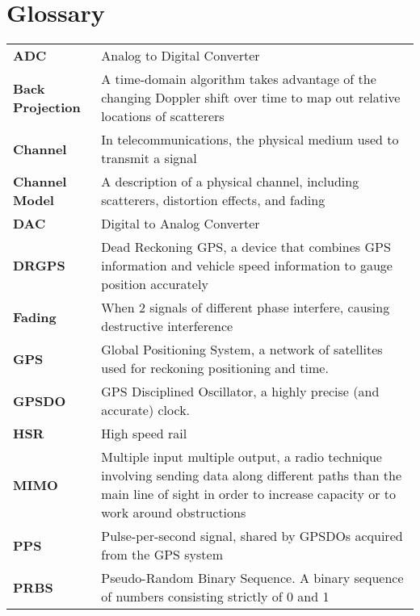 
\chapter*{Glossary}

\renewcommand{\arraystretch}{1.5}
\begin{longtable}{>{\raggedleft\arraybackslash}p{3.5cm}p{11cm}}
\bfseries{ADC} & Analog to Digital Converter\\
\bfseries{Back Projection} & A time-domain algorithm takes advantage of the changing Doppler shift over time to map out relative locations of scatterers\\
\bfseries{Channel} & In telecommunications, the physical medium used to transmit a signal\\
\bfseries{Channel Model} & A description of a physical channel, including scatterers, distortion effects, and fading\\
\bfseries{DAC} & Digital to Analog Converter\\
\bfseries{DRGPS} & Dead Reckoning GPS, a device that combines GPS information and vehicle speed information to gauge position accurately\\
\bfseries{Fading} & When 2 signals of different phase interfere, causing destructive interference\\
\bfseries{GPS} & Global Positioning System, a network of satellites used for reckoning positioning and time. \\
\bfseries{GPSDO} & GPS Disciplined Oscillator, a highly precise (and accurate) clock. \\
\bfseries{HSR} & High speed rail \\
\bfseries{MIMO} & Multiple input multiple output, a radio technique involving sending data along different paths than the main line of sight in order to increase capacity or to work around obstructions\\
\bfseries{PPS} & Pulse-per-second signal, shared by GPSDOs acquired from the GPS system\\
\bfseries{PRBS} & Pseudo-Random Binary Sequence. A binary sequence of numbers consisting strictly of 0 and 1\\

\end{longtable}
